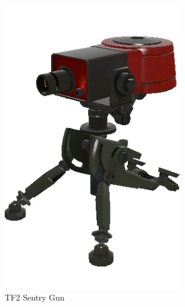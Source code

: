 \documentclass[12pt,a4paper]{article}
\begin{document}
\begin{figure}[h!]
	\centering
	\begin{minipage}{.5\textwidth}
		\centering
		\includegraphics[width=0.8\linewidth]{irod_tf2} 
		\caption{TF2 Sentry Gun \cite{tf2}}
		\label{fig:irod_tf2}
	\end{minipage}%
	\begin{minipage}{.5\textwidth}
		\centering

\end{minipage}
\end{figure}
\end{document}
